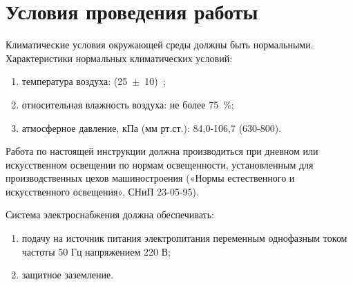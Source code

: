 
\section{Условия проведения работы}

  \point Климатические условия окружающей среды должны быть нормальными.
	Характеристики нормальных климатических условий:
  \begin{enumerate}  
    \item температура воздуха: (25~$\pm$~10)~\textcelsius;
    \item относительная влажность воздуха: не более 75~\%;
    \item атмосферное давление, кПа (мм рт.ст.): 84,0-106,7 (630-800).
  \end{enumerate}

  \point Работа по настоящей инструкции должна производиться при дневном или искусственном освещении 
	  по нормам освещенности, установленным для производственных цехов машиностроения 
	  («Нормы естественного и искусственного освещения», СНиП 23-05-95).

  \point Система электроснабжения должна обеспечивать:
  \begin{enumerate}
    \item подачу на источник питания электропитания переменным однофазным током частоты 50 Гц напряжением 220 В;
    \item защитное заземление.
  \end{enumerate}